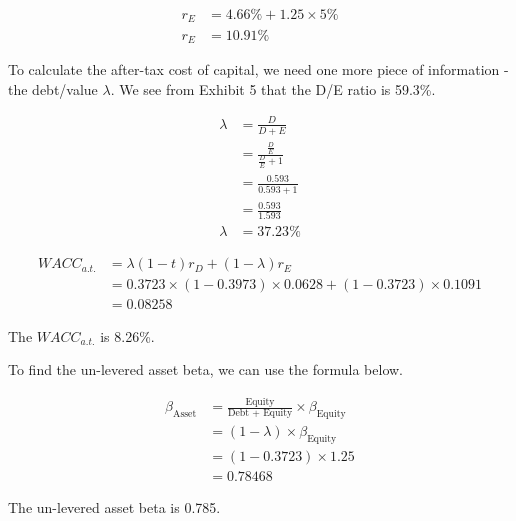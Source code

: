 \documentclass[letterpaper]{article}
\begin{document}
\begin{align*}
r_E &= 4.66\% + 1.25 \times 5\% \\
r_E &= 10.91\%
\end{align*}

To calculate the after-tax cost of capital, we need one more piece of information - the debt/value $\lambda$. We see from Exhibit 5 that the D/E ratio is 59.3\%.

\begin{align*}
    \lambda &= \frac{D}{D+E} \\
            &= \frac{\frac{D}{E}}{\frac{D}{E} + 1} \\
            &= \frac{0.593}{0.593 + 1} \\
            &= \frac{0.593}{1.593} \\
    \lambda &= 37.23\%
\end{align*}

\begin{align*}
WACC_{a.t.} &= \lambda (1-t) r_D + (1-\lambda)r_E \\
            &= 0.3723 \times (1 - 0.3973) \times 0.0628 + (1 - 0.3723) \times 0.1091 \\
            &= 0.08258
\end{align*}

The $WACC_{a.t.}$ is 8.26\%.

To find the un-levered asset beta, we can use the formula below.

\begin{align*}
\beta_{\text{Asset}} &= \frac{\text{Equity}}{\text{Debt + Equity}}\times \beta_{\text{Equity}} \\
                    &= (1 - \lambda) \times \beta_{\text{Equity}} \\
                    &= (1 - 0.3723) \times 1.25 \\
                    &= 0.78468
\end{align*}

The un-levered asset beta is 0.785.
\end{document}
